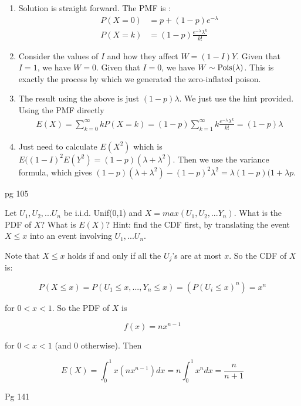 \documentclass[11pt]{article}
\begin{document}
\begin{solution}
\begin{enumerate}
\item Solution is straight forward. The PMF is :
\begin{align*}
P(X = 0) &= p + (1-p)e^{-\lambda} \\
P(X = k) &= (1-p)\frac{e^{-\lambda}\lambda^k}{k!}\textbf{}
\end{align*}

\item Consider the values of $I$ and how they affect $W = (1-I)Y$. Given that $I = 1$, we have $W = 0$. Given that $I = 0$, we have $W \sim \textrm{Pois}(\lambda)$. This is exactly the process by which we generated the zero-inflated poison.
\item The result using the above is just $(1-p)\lambda$. We just use the hint provided. Using the PMF directly
\begin{align*}
E(X) = \sum_{k=0}^{\infty} k P(X = k) = (1-p)\sum_{k=1}^{\infty} k\frac{e^{-\lambda}\lambda^k}{k!} = (1-p)\lambda
\end{align*}
\item Just need to calculate $E(X^2)$ which is $E((1-I)^2E(Y^2) = (1-p)(\lambda + \lambda^2)$. Then we use the variance formula, which gives $(1-p)(\lambda + \lambda^2) - (1-p)^2\lambda^2 = \lambda(1-p)(1 + \lambda p$.

\end{enumerate}
pg 105
\end{solution}

\begin{exercise}
Let $U_1,U_2,...U_n$ be i.i.d. Unif(0,1) and $X = max(U_1,U_2,...Y_n)$. What is the PDF of $X$? What is $E(X)$?
Hint: find the CDF first, by translating the event $X \le x $ into an event involving $U_1,...U_n$.
\end{exercise}
\begin{solution}
Note that $X \le x$ holds if and only if all the $U_j$'s are at most $x$. So the CDF of $X$ is:

$$P(X \le x) = P(U_1 \le x, ..., Y_n \le x) = (P(U_i \le x)^n) = x^n$$

for $0 < x < 1$. So the PDF of $X$ is

$$f(x) = nx^{n-1}$$

for $0 < x < 1$ (and 0 otherwise). Then

$$E(X) = \int_{0}^1 x(nx^{n-1})dx = n \int_{0}^1 x^n dx = \frac{n}{n+1}$$

Pg 141

\end{solution}
\end{document}
